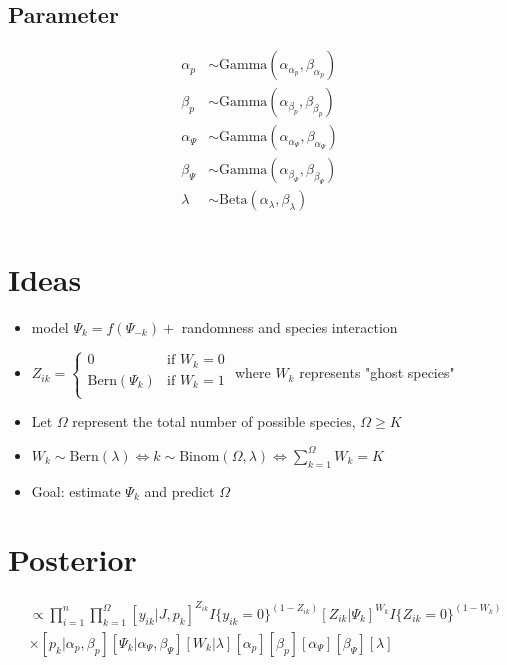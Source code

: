 \documentclass[fleqn]{article}
\def\bm#1{\mbox{\boldmath $#1$}}
\begin{document}
\subsection{Parameter}
%
\begin{align*}
  \alpha_p & \sim \mbox{Gamma}(\alpha_{\alpha_p}, \beta_{\alpha_p})\\
  \beta_p & \sim \mbox{Gamma}(\alpha_{\beta_p}, \beta_{\beta_p})\\
  \alpha_\Psi & \sim \mbox{Gamma}(\alpha_{\alpha_\Psi}, \beta_{\alpha_\Psi})\\
  \beta_\Psi & \sim \mbox{Gamma}(\alpha_{\beta_\Psi}, \beta_{\beta_\Psi})\\
  \lambda & \sim \mbox{Beta}(\alpha_\lambda, \beta_\lambda)\\
\end{align*}
%
\section{Ideas}
%
\begin{itemize}
  \item model $\Psi_k = f(\Psi_{ - k}) +$ randomness and species interaction
  \item $
  Z_{ik}  = 
  \begin{cases}
    0 & \mbox{if } W_k = 0\\
    \mbox{Bern}(\Psi_k) & \mbox{if } W_k = 1\\
  \end{cases}$ where $W_k$ represents "ghost species"
  \item Let $\Omega$ represent the total number of possible species, $\Omega \geq K$
  \item $W_k \sim \mbox{Bern}(\lambda) \Leftrightarrow k \sim \mbox{Binom}(\Omega, \lambda) \Leftrightarrow \sum_{k = 1}^\Omega W_k = K$
  \item Goal: estimate $\Psi_k$ and predict $\Omega$
\end{itemize}
%
\section{Posterior}
%
\begin{align*}
  [\bm{Z}, \bm{p}, \bm{\Psi}, \bm{W}, \alpha_p, \beta_p, \alpha_\Psi, \beta_\Psi, \lambda | \bm{y}, J] & \propto \prod_{i = 1}^n \prod_{k = 1}^\Omega [y_{ik} | J, p_k]^{Z_{ik}} I\{y_{ik} = 0 \}^{(1 -  Z_{ik})} [Z_{ik} | \Psi_k]^{W_k} I\{Z_{ik} = 0 \}^{(1 -  W_k)}\\
  & \times [p_k | \alpha_p, \beta_p] [\Psi_k | \alpha_\Psi, \beta_\Psi] [W_k | \lambda] [\alpha_p] [\beta_p] [\alpha_\Psi] [\beta_\Psi] [\lambda]
\end{align*}
%
\end{document}
